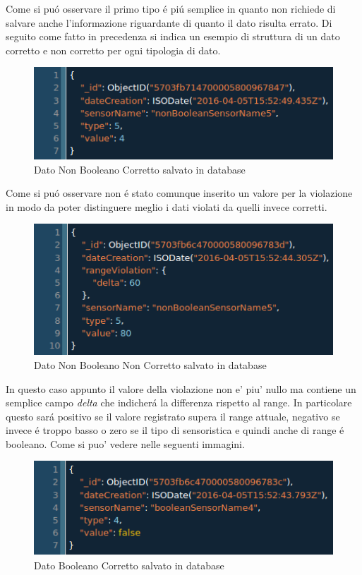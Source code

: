Come si pu\'o osservare il primo tipo \'e pi\'u semplice in quanto non richiede di salvare anche l'informazione riguardante di quanto il dato risulta errato. Di seguito come fatto in precedenza si indica un esempio di struttura di un dato corretto e non corretto per ogni tipologia di dato.

\begin{figure}[ht]
\centering
\includegraphics[scale=0.5,natwidth=610,natheight=642]{Figures/DataStructures/DataNoViolation.png}
\caption{Dato Non Booleano Corretto salvato in database}
\end{figure}

Come si pu\'o osservare non \'e stato comunque inserito un valore per la violazione in modo da poter distinguere meglio i dati violati da quelli invece corretti.

\begin{figure}[ht]
\centering
\includegraphics[scale=0.5,natwidth=610,natheight=642]{Figures/DataStructures/DataViolation.png}
\caption{Dato Non Booleano Non Corretto salvato in database}
\end{figure}

In questo caso appunto il valore della violazione non e' piu' nullo ma contiene un semplice campo \textit{delta} che indicher\'a la differenza rispetto al range. In particolare questo sar\'a positivo se il valore registrato supera il range attuale, negativo se invece \'e troppo basso o zero se il tipo di sensoristica e quindi anche di range \'e booleano. Come si puo' vedere nelle seguenti immagini.

\begin{figure}[ht]
\centering
\includegraphics[scale=0.5,natwidth=610,natheight=642]{Figures/DataStructures/BooleanDataNoViolation.png}
\caption{Dato Booleano Corretto salvato in database}
\end{figure}

